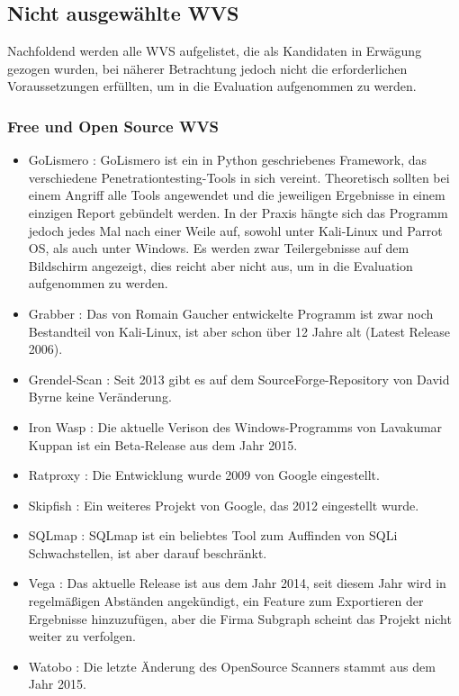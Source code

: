 \documentclass[12pt,oneside,a4paper,parskip]{scrbook}
\begin{document}
  \subsection{Nicht ausgewählte WVS}
    Nachfoldend werden alle WVS aufgelistet, die als Kandidaten in Erwägung gezogen wurden, bei näherer Betrachtung jedoch nicht die erforderlichen Voraussetzungen erfüllten, um in die Evaluation aufgenommen zu werden.
    \subsubsection{Free und Open Source WVS}
    \begin{itemize}
      \item GoLismero \cite{GoLismero}: GoLismero ist ein in Python geschriebenes Framework, das verschiedene Penetrationtesting-Tools in sich vereint. Theoretisch sollten bei einem Angriff alle Tools angewendet und die jeweiligen Ergebnisse in einem einzigen Report gebündelt werden. In der Praxis hängte sich das Programm jedoch jedes Mal nach einer Weile auf, sowohl unter Kali-Linux und Parrot OS, als auch unter Windows. Es werden zwar Teilergebnisse auf dem Bildschirm angezeigt, dies reicht aber nicht aus, um in die Evaluation aufgenommen zu werden.
      \item Grabber \cite{Grabber}: Das von Romain Gaucher entwickelte Programm ist zwar noch Bestandteil von Kali-Linux, ist aber schon über 12 Jahre alt (Latest Release 2006).
      \item Grendel-Scan \cite{Grendel}: Seit 2013 gibt es auf dem SourceForge-Repository von David Byrne keine Veränderung.
      \item Iron Wasp \cite{Iron}: Die aktuelle Verison des Windows-Programms von Lavakumar Kuppan ist ein Beta-Release aus dem Jahr 2015.
      \item Ratproxy \cite{Ratproxy}: Die Entwicklung wurde 2009 von Google eingestellt.
      \item Skipfish \cite{Skipfish}: Ein weiteres Projekt von Google, das 2012 eingestellt wurde.
      \item SQLmap \cite{SQLmap}: SQLmap ist ein beliebtes Tool zum Auffinden von SQLi Schwachstellen, ist aber darauf beschränkt.
      \item Vega \cite{Vega}: Das aktuelle Release ist aus dem Jahr 2014, seit diesem Jahr wird in regelmäßigen Abständen angekündigt, ein Feature zum Exportieren der Ergebnisse hinzuzufügen, aber die Firma Subgraph scheint das Projekt nicht weiter zu verfolgen.
      \item Watobo \cite{Watobo}: Die letzte Änderung des OpenSource Scanners stammt aus dem Jahr 2015.

\end{itemize}
\end{document}
